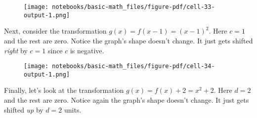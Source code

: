 \documentclass[
  letterpaper,
  DIV=11,
  numbers=noendperiod]{scrreprt}
\newenvironment{Shaded}{\begin{snugshade}}{\end{snugshade}}
\newcommand{\DecValTok}[1]{\textcolor[rgb]{0.68,0.00,0.00}{#1}}
\newcommand{\KeywordTok}[1]{\textcolor[rgb]{0.00,0.23,0.31}{#1}}
\newcommand{\NormalTok}[1]{\textcolor[rgb]{0.00,0.23,0.31}{#1}}
\newcommand{\OperatorTok}[1]{\textcolor[rgb]{0.37,0.37,0.37}{#1}}
\newcommand{\SpecialCharTok}[1]{\textcolor[rgb]{0.37,0.37,0.37}{#1}}
\newcommand{\SpecialStringTok}[1]{\textcolor[rgb]{0.13,0.47,0.30}{#1}}
\begin{document}
\begin{figure}[H]

{\centering \texttt{[image: notebooks/basic-math\_files/figure-pdf/cell-33-output-1.png]}

}

\end{figure}

Next, consider the transformation \(g(x) = f(x-1) = (x-1)^2.\) Here
\(c=1\) and the rest are zero. Notice the graph's shape doesn't change.
It just gets shifted \emph{right} by \(c=1\) since \(c\) is negative.

\begin{Shaded}
\end{Shaded}

\begin{figure}[H]

{\centering \texttt{[image: notebooks/basic-math\_files/figure-pdf/cell-34-output-1.png]}

}

\end{figure}

Finally, let's look at the transformation \(g(x) = f(x) + 2 = x^2 + 2\).
Here \(d=2\) and the rest are zero. Notice again the graph's shape
doesn't change. It just gets shifted \emph{up} by \(d=2\) units.

\begin{Shaded}
\end{Shaded}
\end{document}
